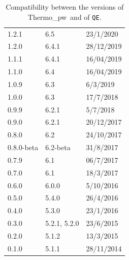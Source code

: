 \documentclass[12pt,a4paper,twoside]{report}
\def\thermo{{\sc Thermo}\_{\sc pw}}
\begin{document}
\begin{table}
\begin{center}
\begin{tabular}{lll}
1.2.1 & 6.5 & 23/1/2020 \\
1.2.0 & 6.4.1 & 28/12/2019 \\
1.1.1 & 6.4.1 & 16/04/2019 \\
1.1.0 & 6.4 & 16/04/2019 \\
1.0.9 & 6.3 & 6/3/2019 \\
1.0.0 & 6.3 & 17/7/2018 \\
0.9.9 & 6.2.1 & 5/7/2018 \\
0.9.0 & 6.2.1 & 20/12/2017 \\
0.8.0 & 6.2 & 24/10/2017 \\
0.8.0-beta & 6.2-beta & 31/8/2017\\
0.7.9 & 6.1 & 06/7/2017 \\
0.7.0 & 6.1 & 18/3/2017 \\
0.6.0 & 6.0.0 & 5/10/2016 \\
0.5.0 & 5.4.0 & 26/4/2016 \\
0.4.0 & 5.3.0 & 23/1/2016 \\
0.3.0 & 5.2.1, 5.2.0 & 23/6/2015 \\
0.2.0 & 5.1.2 & 13/3/2015 \\
0.1.0 & 5.1.1 & 28/11/2014 \\
\hline
\hline
\end{tabular}
\caption{Compatibility between the versions of 
\thermo\ and of \texttt{QE}.}
\end{center}
\end{table}
\end{document}
